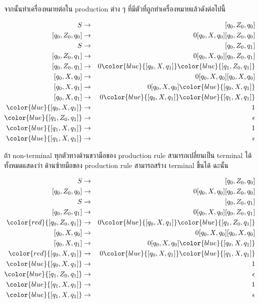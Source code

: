 \par{
จากนั้นทำเครื่องหมายต่อใน production ต่าง ๆ ที่มีตัวที่ถูกทำเครื่องหมายแล้วดังต่อไปนี้

\begin{eqnarray*}
S & \rightarrow & [q_0,Z_0, q_0] \\
\left[q_0, Z_0, q_0\right] & \rightarrow & 0 [ q_0, X, q_0][q_0, Z_0, q_0] \\
%
S & \rightarrow & [q_0,Z_0, q_1] \\
\left[q_0, Z_0, q_1\right] & \rightarrow & 0 [ q_0, X, q_0][q_0, Z_0, q_1] \\
\left[q_0, Z_0, q_1\right] & \rightarrow & 0 \color{blue}{[ q_0, X, q_1]}\color{blue}{[q_1, Z_0, q_1]} \\
%
\left[q_0, X, q_0\right] & \rightarrow & 0[q_0, X, q_0][q_0, X, q_0] \\
\left[q_0, X, q_1\right] & \rightarrow & 0[q_0, X, q_0]\color{blue}{[q_0, X, q_1]} \\
\left[q_0, X, q_1\right] & \rightarrow & 0\color{blue}{[q_0, X, q_1]}\color{blue}{[q_1, X, q_1]} \\
%
\color{blue}{\left[q_0, X, q_1\right]} & \rightarrow & 1 \\
\color{blue}{\left[q_1, Z_0, q_1\right]} & \rightarrow & \epsilon \\
\color{blue}{\left[q_1, X, q_1\right]} & \rightarrow & 1 \\
\color{blue}{\left[q_1, X, q_1\right]} & \rightarrow & \epsilon
\end{eqnarray*}
}

\par{
ถ้า non-terminal ทุกตัวทางด้านขวามือของ production rule สามารถเปลี่ยนเป็น terminal ได้ทั้งหมดแสดงว่า ด้านซ้ายมือของ production rule สามารถสร้าง terminal ขึ้นได้ ฉะนั้น

\begin{eqnarray*}
S & \rightarrow & [q_0,Z_0, q_0] \\
\left[q_0, Z_0, q_0\right] & \rightarrow & 0 [ q_0, X, q_0][q_0, Z_0, q_0] \\
%
S & \rightarrow & [q_0,Z_0, q_1] \\
\left[q_0, Z_0, q_1\right] & \rightarrow & 0 [ q_0, X, q_0][q_0, Z_0, q_1] \\
\color{red}{\left[q_0, Z_0, q_1\right]} & \rightarrow & 0 \color{blue}{[ q_0, X, q_1]}\color{blue}{[q_1, Z_0, q_1]} \\
%
\left[q_0, X, q_0\right] & \rightarrow & 0[q_0, X, q_0][q_0, X, q_0] \\
\left[q_0, X, q_1\right] & \rightarrow & 0[q_0, X, q_0]\color{blue}{[q_0, X, q_1]} \\
\color{red}{\left[q_0, X, q_1\right]} & \rightarrow & 0\color{blue}{[q_0, X, q_1]}\color{blue}{[q_1, X, q_1]} \\
%
\color{blue}{\left[q_0, X, q_1\right]} & \rightarrow & 1 \\
\color{blue}{\left[q_1, Z_0, q_1\right]} & \rightarrow & \epsilon \\
\color{blue}{\left[q_1, X, q_1\right]} & \rightarrow & 1 \\
\color{blue}{\left[q_1, X, q_1\right]} & \rightarrow & \epsilon 
\end{eqnarray*}
}

